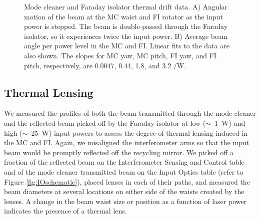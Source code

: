 \begin{figure}
\begin{centering}
\caption[Mode cleaner and Faraday isolator thermal drift data.]{Mode
  cleaner and Faraday isolator thermal drift data. A) Angular motion
  of the beam at the MC waist and FI rotator as the input power is
  stepped. The beam is double-passed through the Faraday isolator, so
  it experiences twice the input power. B) Average beam angle per
  power level in the MC and FI. Linear fits to the data are also
  shown. The slopes for MC yaw, MC pitch, FI yaw, and FI pitch,
  respectively, are 0.0047, 0.44, 1.8, and 3.2 \microrad/W.}
\label{fig:drift}
\end{centering}
\end{figure}


\subsection{Thermal Lensing}
We measured the profiles of both the beam transmitted through the
mode cleaner and the reflected beam picked off by the Faraday isolator
at low ($\sim$~1~W) and high ($\sim$~25~W) input powers to assess the
degree of thermal lensing induced in the MC and FI. Again, we
misaligned the interferometer arms so that the input beam would be
promptly reflected off the recycling mirror. We picked off a fraction
of the reflected beam on the Interferometer Sensing and Control table
and of the mode cleaner transmitted beam on the Input Optics table
(refer to Figure \ref{fig:IOschematic}), placed lenses in each of their
paths, and measured the beam diameters at several locations on either
side of the waists created by the lenses. A change in the beam waist
size or position as a function of laser power indicates the presence
of a thermal lens.

